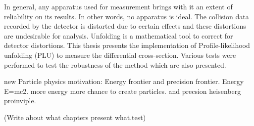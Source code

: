 In general, any apparatus used for measurement brings with it an extent of reliability on its results. In other words, no apparatus is ideal. The collision
data recorded by the detector is distorted due to certain effects and these distortions are undesirable for analysis. Unfolding is a mathematical tool to 
correct for detector distortions. This thesis presents the implementation of Profile-likelihood unfolding (PLU) to measure the differential cross-section. 
Various tests were performed to test the robustness of the method which are also presented. 

new Particle physics motivation: Energy frontier and precision frontier. Energy E=mc2. more energy more chance to create particles. and precsion heisenberg proinviple.

(Write about what chapters present what.test)